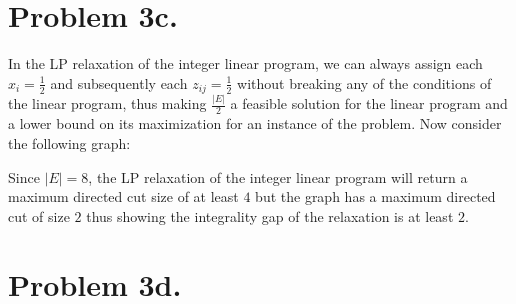 \documentclass[12pt]{article}
\begin{document}
\section*{Problem 3c.}
In the LP relaxation of the integer linear program, we can always assign each
$x_i = \frac{1}{2}$ and subsequently each $z_{ij} = \frac{1}{2}$ without
breaking any of the conditions of the linear program, thus making
$\frac{|E|}{2}$ a feasible solution for the linear program and a lower bound on
its maximization for an instance of the problem. Now consider the following
graph:
\newline
\begin{center}
\end{center}
Since $|E| = 8$, the LP relaxation of the integer linear program will return
a maximum directed cut size of at least $4$ but the graph has a maximum
directed cut of size $2$ thus showing the integrality gap of the relaxation is
at least $2$.

\section*{Problem 3d.}
\end{document}
